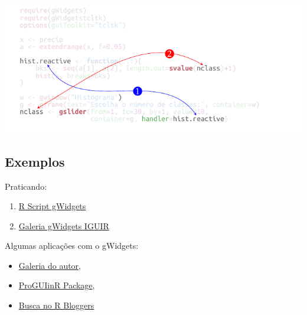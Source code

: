 \begin{frame}
\includegraphics[scale=1]{./tikz/hist_slider_gWidgets-2.pdf}
\end{frame}


\subsection*{Exemplos}

\begin{frame}
 Praticando:
  \begin{enumerate}
  \item
    \href{run:./R/gWidgets/gWidgets.R}{R Script gWidgets}
  \item 
	\href{run:gWidgets.html}{Galeria gWidgets IGUIR}
  \end{enumerate}

  \vspace{0.5cm}
  Algumas aplicações com o gWidgets:
  \begin{itemize}
  \item \href{http://cran.r-project.org/web/packages/gWidgets/vignettes/}{Galeria
      do autor},
  \item \href{https://github.com/jverzani/ProgGUIinR}{ProGUIinR Package},
  \item \href{http://www.r-bloggers.com/?s=gWidgets}{Busca no R
      Bloggers}
  \end{itemize}
\end{frame}

